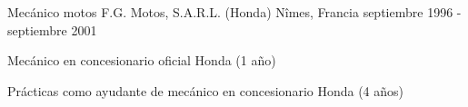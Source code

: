 \begin{cventries}
  \cventry
    {Mecánico motos} %
    {F.G. Motos, S.A.R.L. (Honda)} %
    {Nîmes, Francia} %
    {septiembre 1996 - septiembre 2001} %
    {
      \begin{cvitems} %
        \item {Mecánico en concesionario oficial Honda (1 año)}
        \item {Prácticas como ayudante de mecánico en concesionario Honda (4 años)}
      \end{cvitems}
    }

\end{cventries}
